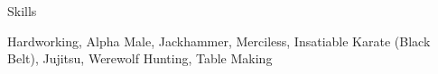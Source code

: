 \section{\faGears}{Skills}

\resumeEntryStart

 {Hardworking, Alpha Male, Jackhammer, Merciless, Insatiable}
 {Karate (Black Belt), Jujitsu, Werewolf Hunting, Table Making}

\resumeEntryEnd
